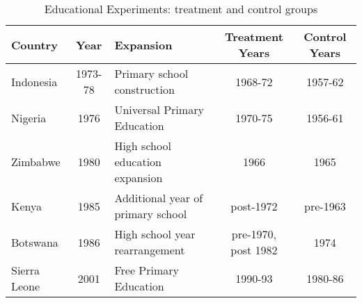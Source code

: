 \begin{table}[htpb]
\begin{center}
\caption{Educational Experiments: treatment and control groups}
\label{MMRtab:EducExp}
\begin{tabular}{lclcc}
\toprule
Country & Year & Expansion & Treatment Years & Control Years \\ 
\midrule
Indonesia & 1973-78 & Primary school construction & 1968-72 & 1957-62  \\
Nigeria & 1976 & Universal Primary Education & 1970-75 & 1956-61 \\
Zimbabwe & 1980 & High school education expansion & 1966 & 1965 \\
Kenya & 1985 & Additional year of primary school & post-1972 & pre-1963 \\
Botswana & 1986 & High school year rearrangement & pre-1970, post 1982  & 1974 \\
Sierra Leone & 2001 & Free Primary Education & 1990-93 & 1980-86 \\
\bottomrule
\end{tabular}
\end{center}
\end{table}

